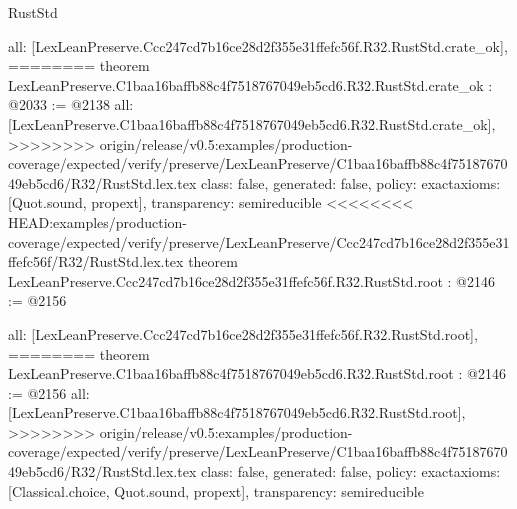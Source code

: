 \begin{lexlean}{RustStd}
\begin{coremodule}
{\begin{coremodule}
{{{{{{  all: [LexLeanPreserve.Ccc247cd7b16ce28d2f355e31ffefc56f.R32.RustStd.crate_ok],
========
theorem LexLeanPreserve.C1baa16baffb88c4f7518767049eb5cd6.R32.RustStd.crate_ok : @2033 := @2138 {
  all: [LexLeanPreserve.C1baa16baffb88c4f7518767049eb5cd6.R32.RustStd.crate_ok],
>>>>>>>> origin/release/v0.5:examples/production-coverage/expected/verify/preserve/LexLeanPreserve/C1baa16baffb88c4f7518767049eb5cd6/R32/RustStd.lex.tex
  class: false,
  generated: false,
  policy: exact{axioms: [Quot.sound, propext]},
  transparency: semireducible
}
<<<<<<<< HEAD:examples/production-coverage/expected/verify/preserve/LexLeanPreserve/Ccc247cd7b16ce28d2f355e31ffefc56f/R32/RustStd.lex.tex
theorem LexLeanPreserve.Ccc247cd7b16ce28d2f355e31ffefc56f.R32.RustStd.root : @2146 := @2156 {
  all: [LexLeanPreserve.Ccc247cd7b16ce28d2f355e31ffefc56f.R32.RustStd.root],
========
theorem LexLeanPreserve.C1baa16baffb88c4f7518767049eb5cd6.R32.RustStd.root : @2146 := @2156 {
  all: [LexLeanPreserve.C1baa16baffb88c4f7518767049eb5cd6.R32.RustStd.root],
>>>>>>>> origin/release/v0.5:examples/production-coverage/expected/verify/preserve/LexLeanPreserve/C1baa16baffb88c4f7518767049eb5cd6/R32/RustStd.lex.tex
  class: false,
  generated: false,
  policy: exact{axioms: [Classical.choice, Quot.sound, propext]},
  transparency: semireducible
}

}}}}}}}
\end{coremodule}}
\end{coremodule}
\end{lexlean}

